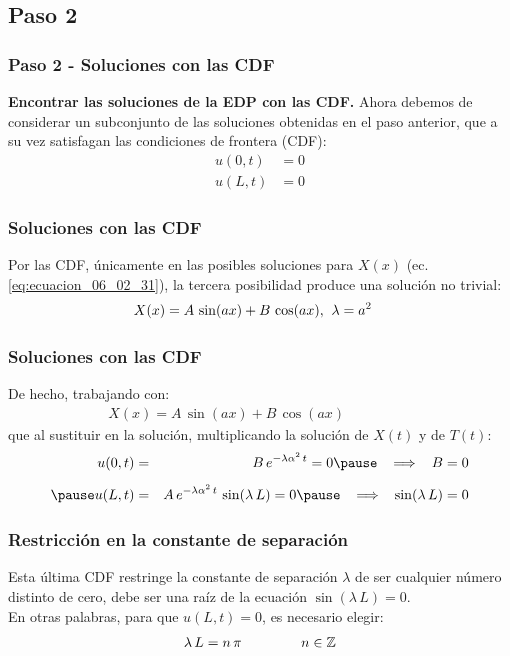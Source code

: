 \documentclass[12pt]{beamer}
\begin{document}
\subsection{Paso 2}

\begin{frame}
\frametitle{Paso 2 - Soluciones con las CDF}
\textbf{Encontrar las soluciones de la EDP con las CDF.}
\pause
Ahora debemos de considerar un subconjunto de las soluciones obtenidas en el paso anterior, que a su vez satisfagan las condiciones de frontera (CDF):
\pause
\begin{align*}
u (0, t) &= 0 \\[0.5em]
u (L, t) &= 0
\end{align*}
\end{frame}
\begin{frame}
\frametitle{Soluciones con las CDF}
Por las CDF, únicamente en las posibles soluciones para $X(x)$ (ec. \ref{eq:ecuacion_06_02_31}), la tercera posibilidad produce una solución no trivial:
\pause
\begin{align*}
X (x) = A \, \sin (a x) + B \, \cos (a x ), & \hspace{0.2cm} \lambda = a^{2}
\end{align*}
\end{frame}
\begin{frame}
\frametitle{Soluciones con las CDF}
De hecho, trabajando con:
\pause
\begin{align*}
X (x) = A \, \sin (a x) + B \, \cos (a x) \hspace{2cm}
\end{align*}
\pause
que al sustituir en la solución, multiplicando la solución de $X (t)$ y de $T (t)$:
\begin{eqnarray*}
u (0, t) &=& B \, e^{-\lambda \alpha^{2} \, t} = 0 \pause \hspace{0.3cm} \Longrightarrow \hspace{0.3cm} B = 0 \\[0.5em] \pause
u (L, t) &=& A \, e^{-\lambda \alpha^{2} \, t} \, \sin (\lambda \, L) = 0 \pause \hspace{0.3cm} \Longrightarrow \hspace{0.3cm} \sin (\lambda \, L) = 0
\end{eqnarray*}
\end{frame}
\begin{frame}
\frametitle{Restricción en la constante de separación}
Esta última CDF restringe la constante de separación $\lambda$ de ser cualquier número distinto de cero, debe ser una raíz de la ecuación $\sin (\lambda \, L) = 0$.
\\
\bigskip
\pause
En otras palabras, para que $u (L, t) = 0$, es necesario elegir:
\pause
\begin{align}
\lambda \, L = n \, \pi \hspace{1.5cm} n \in \mathbb{Z}
\label{eq:ecuacion_06_02_34}    
\end{align}
\end{frame}
\end{document}

